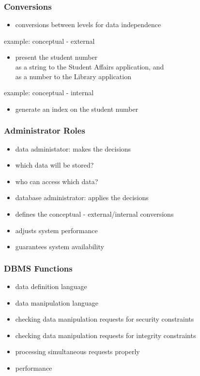 \documentclass[dvipsnames]{beamer}
\theoremstyle{plain}
\begin{document}
\begin{frame}
  \frametitle{Conversions}

  \begin{itemize}
    \item conversions between levels for data independence
  \end{itemize}

  \medskip
  \begin{exampleblock}{example: conceptual - external}
    \begin{itemize}
      \item present the student number\\
        as a string to the Student Affairs application, and\\
        as a number to the Library application
    \end{itemize}
  \end{exampleblock}

  \pause
  \begin{exampleblock}{example: conceptual - internal}
    \begin{itemize}
      \item generate an index on the student number
    \end{itemize}
  \end{exampleblock}
\end{frame}

\begin{frame}
  \frametitle{Administrator Roles}

  \begin{itemize}
    \item data administator: makes the decisions
    \item which data will be stored?
    \item who can access which data?

    \pause
    \bigskip
    \item database administrator: applies the decisions
    \item defines the conceptual - external/internal conversions
    \item adjusts system performance
    \item guarantees system availability
  \end{itemize}
\end{frame}

\begin{frame}
  \frametitle{DBMS Functions}

  \begin{itemize}
    \item data definition language
    \item data manipulation language
    
    \pause
    \medskip
    \item checking data manipulation requests for security constraints
    \item checking data manipulation requests for integrity constraints
    \item processing simultaneous requests properly
    \item performance
  \end{itemize}
\end{frame}
\end{document}
